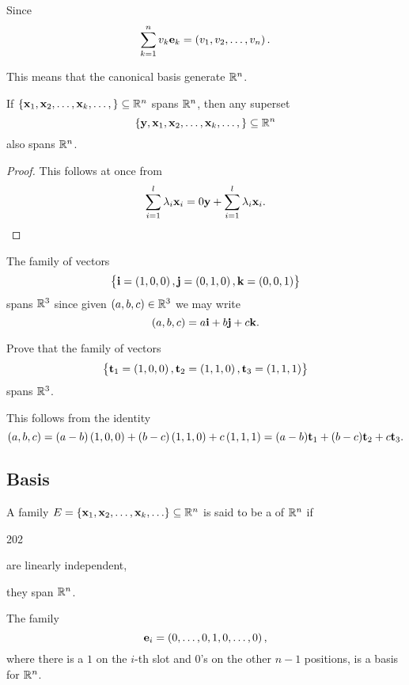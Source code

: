 \begin{exa}
Since  \begin{equation}
               \sum _{k = 1} ^n v_k\mathbf{ e}_k   =  \left(v_1,
v_2, \dots, v_n\right). \label{eq:span2}
             \end{equation}
             
This means that  the canonical basis generate $\mathbb{R} ^n$.

\end{exa}


\begin{thm}
If $\{\mathbf{ x}_1, \mathbf{ x}_2, \ldots , \mathbf{ x}_k, \ldots, \} \subseteq \mathbb{R} ^n$
spans $\mathbb{R} ^n$, then any superset $$\{\mathbf{ y}, \mathbf{ x}_1, \mathbf{ x}_2, \ldots ,
\mathbf{ x}_k, \ldots, \} \subseteq \mathbb{R} ^n$$ also spans $\mathbb{R} ^n$.
\end{thm}
\begin{proof}
This follows at once from
$$ \sum _{i = 1} ^l \lambda _i \mathbf{ x}_i = 0\mathbf{ y} + \sum _{i = 1} ^l \lambda _i \mathbf{ x}_i.$$
\end{proof}
\begin{exa}
The family of vectors $$\left\{\mathbf{ i} = \left( 1, 0 ,
0 \right), \mathbf{ j} = \left( 0, 1, 0 \right), \mathbf{ k} = \left( 0,
0, 1 \right)\right\}$$ spans $\mathbb{R}^3$ since given $\left( a, b,
c \right)\in\mathbb{R}^3$ we may write $$\left( a, b, c \right) = a\mathbf{ i} + b\mathbf{ j} +
c\mathbf{ k} .$$ \label{exa:ijk}\end{exa}
\begin{exa}
Prove that the family of vectors $$\left\{\mathbf{ t}_1 = \left( 1, 0 ,
0 \right), \mathbf{ t}_2 = \left( 1, 1, 0 \right), \mathbf{ t}_3 = \left( 1,
1, 1 \right)\right\}$$ spans $\mathbb{R}^3$.\label{triagbasisr3}\end{exa}
\begin{solu}This follows from the identity
$$\left( a, b, c \right) = (a - b)\left( 1, 0, 0 \right) + (b - c)\left( 1, 1, 0 \right) + c\left( 1, 1, 1 \right) = (a - b)\mathbf{ t}_1 + (b - c)\mathbf{ t}_2 + c\mathbf{ t}_3.$$
\end{solu}




\subsection{Basis}
\begin{df}
A family $E=\{\mathbf{ x}_1, \mathbf{ x}_2, \ldots , \mathbf{ x}_k, \ldots\} \subseteq
\mathbb{R} ^n$ is said to be a  of  $\mathbb{R} ^n$ if
\begin{dingautolist}{202}
 \item  are linearly
independent,
 \item they span $\mathbb{R} ^n$. 
\end{dingautolist}
\end{df}
\begin{exa}
The family $$ \mathbf{ e}_i =\left(0 ,\dots , 0, 1,  0, \dots , 0
\right),$$ where there is a $1$ on the $i$-th slot and
$0$'s on the other $n - 1$ positions, is a basis for $\mathbb{R}
^n$.
\end{exa}



